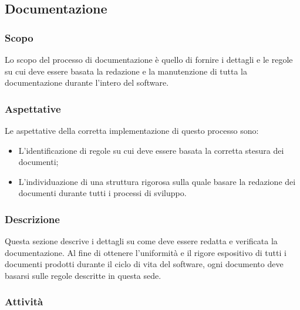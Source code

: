\documentclass[../norme-di-progetto.tex]{subfiles}
\begin{document}
\subsection{Documentazione}
\subsubsection{Scopo}
Lo scopo del processo di documentazione è quello di fornire i dettagli e le regole su cui deve essere basata la redazione e la manutenzione di tutta la documentazione durante l'intero  del software.

\subsubsection{Aspettative}
Le aspettative della corretta implementazione di questo processo sono:
\begin{itemize}
  \item L'identificazione di regole su cui deve essere basata la corretta stesura dei documenti;
  \item L'individuazione di una struttura rigorosa sulla quale basare la redazione dei documenti durante tutti i processi di sviluppo.
\end{itemize}

\subsubsection{Descrizione}
Questa sezione descrive i dettagli su come deve essere redatta e verificata la documentazione. Al fine di ottenere l'uniformità e il rigore espositivo di tutti i documenti prodotti durante il ciclo di vita del software, ogni documento deve basarsi sulle regole descritte in questa sede.

\subsubsection{Attività}
\end{document}
